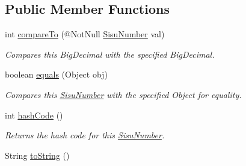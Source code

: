 \subsection*{Public Member Functions}
\begin{DoxyCompactItemize}
\item 
int \hyperlink{classcom_1_1aarrelaakso_1_1drawl_1_1_sisu_number_a83c3a0ab94c18e9b071e4af29f1ad8a2}{compare\+To} (@Not\+Null \hyperlink{classcom_1_1aarrelaakso_1_1drawl_1_1_sisu_number}{Sisu\+Number} val)
\begin{DoxyCompactList}\small\item\em Compares this Big\+Decimal with the specified Big\+Decimal. \end{DoxyCompactList}\item 
boolean \hyperlink{classcom_1_1aarrelaakso_1_1drawl_1_1_sisu_number_a8f5579e8b2e077ead4147751e7ab27ce}{equals} (Object obj)
\begin{DoxyCompactList}\small\item\em Compares this \hyperlink{classcom_1_1aarrelaakso_1_1drawl_1_1_sisu_number}{Sisu\+Number} with the specified Object for equality. \end{DoxyCompactList}\item 
int \hyperlink{classcom_1_1aarrelaakso_1_1drawl_1_1_sisu_number_a84f5852d7f79f865cc51d710d09b7032}{hash\+Code} ()
\begin{DoxyCompactList}\small\item\em Returns the hash code for this \hyperlink{classcom_1_1aarrelaakso_1_1drawl_1_1_sisu_number}{Sisu\+Number}. \end{DoxyCompactList}\item 
String \hyperlink{classcom_1_1aarrelaakso_1_1drawl_1_1_sisu_number_a0ed133b435cf93b55afbecb6d28e6cd6}{to\+String} ()
\end{DoxyCompactItemize}
